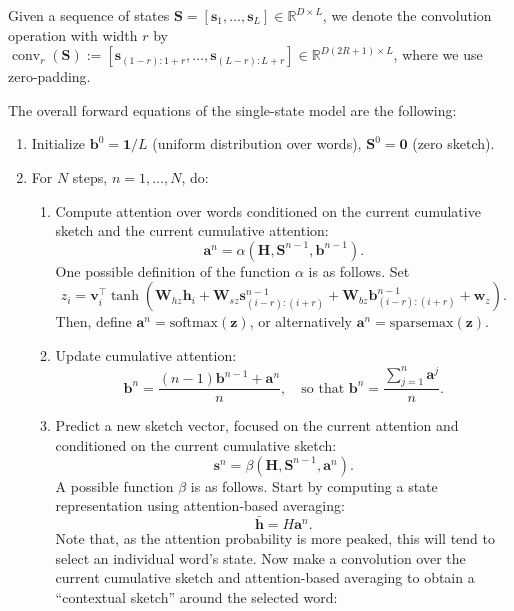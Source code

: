 \documentclass[10pt,a4paper]{article}
\newcommand{\vect}[1]{\mathbf{#1}}
\newcommand{\set}[1]{\mathbb{#1}}
\newcommand{\matr}[1]{\mathbf{#1}}
\newcommand{\vectsymb}[1]{\boldsymbol{#1}}
\newcommand{\hh}{{\vectsymb{h}}}
\newcommand{\sss}{{\vectsymb{s}}}
\newcommand{\aaa}{{\vectsymb{a}}}
\newcommand{\bb}{{\vectsymb{b}}}
\newcommand{\HH}{{\matr{H}}}
\newcommand{\SSS}{{\matr{S}}}
\DeclareMathOperator{\conv}{conv}
\begin{document}
Given a sequence of states $\SSS = [\sss_1, \ldots, \sss_L] \in \set{R}^{D \times L}$, 
we denote the convolution operation with width $r$ by 
$\conv_r(\SSS) := [\sss_{(1-r):{1+r}}, \ldots, \sss_{(L-r):{L+r}}] \in \set{R}^{D(2R+1)\times L}$, 
where we use zero-padding. 

The overall forward equations of the single-state model are the following:
\begin{enumerate}
\item Initialize $\bb^{0} = \vect{1}/L$ (uniform distribution over words), 
$\SSS^{0} = \vect{0}$ (zero sketch).
\item For $N$ steps, $n=1,\ldots,N$, do:
\begin{enumerate}
\item Compute attention over words conditioned on the current cumulative sketch and the current cumulative attention:
\begin{equation}\label{eq:attention}
\aaa^{n} = \alpha(\HH, \SSS^{n-1}, \bb^{n-1}).
\end{equation}
One possible definition of the function $\alpha$ is as follows. 
Set
\begin{equation}
z_i = \vectsymb{v}_i^{\top} \tanh (\matr{W}_{hz}\hh_i + \matr{W}_{sz}\sss^{n-1}_{(i-r):(i+r)} + \matr{W}_{bz} \bb^{n-1}_{(i-r):(i+r)} + \vectsymb{w}_z).
\end{equation}
Then, define $\aaa^{n} = \mathrm{softmax}(\vectsymb{z})$, or alternatively $\aaa^{n} = \mathrm{sparsemax}(\vectsymb{z})$.
\item Update cumulative attention:
\begin{equation}
\bb^{n} = \frac{(n-1) \bb^{n-1} + \aaa^n}{n}, \quad \text{so that $\bb^{n} = \frac{\sum_{j=1}^n \aaa^j}{n}$}.
\end{equation}
\item Predict a new sketch vector, focused on the current attention and conditioned on the current cumulative sketch:
\begin{equation}
\sss^n = \beta(\HH, \SSS^{n-1}, \aaa^{n}).
\end{equation}
A possible function $\beta$ is as follows. 
Start by computing a state representation using attention-based averaging:
\begin{equation}
\bar{\hh} = H\aaa^{n}.
\end{equation}
Note that, as the attention probability is more peaked, this will tend to select an 
individual word's state. 
Now make a convolution over the current cumulative sketch and attention-based averaging to obtain a ``contextual sketch'' around the selected word: 

\end{enumerate}
\end{enumerate}
\end{document}
